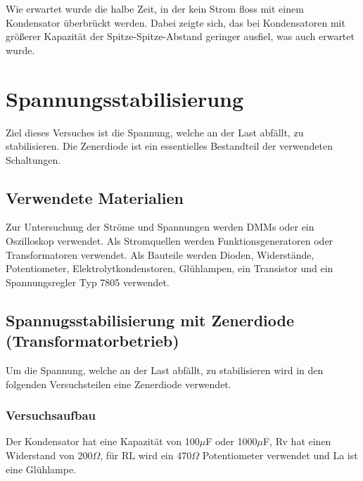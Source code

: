 \documentclass[12pt,a4paper]{article}
\begin{document}
Wie erwartet wurde die halbe Zeit, in der kein Strom floss mit einem Kondensator überbrückt werden. Dabei zeigte sich, das bei Kondensatoren mit größerer Kapazität der Spitze-Spitze-Abstand geringer ausfiel, was auch erwartet wurde. 


\section{Spannungsstabilisierung}
Ziel dieses Versuches ist die Spannung, welche an der Last abfällt, zu stabilisieren. Die Zenerdiode ist ein essentielles Bestandteil der verwendeten Schaltungen.

\subsection{Verwendete Materialien}

Zur Untersuchung der Ströme und Spannungen werden DMMs oder ein Oszilloskop verwendet. Als Stromquellen werden Funktionsgeneratoren oder Transformatoren verwendet. Als Bauteile werden Dioden, Widerstände, Potentiometer, Elektrolytkondenstoren, Glühlampen, ein Transistor und ein Spannungsregler Typ 7805 verwendet.

\subsection{Spannugsstabilisierung mit Zenerdiode (Transformatorbetrieb)}
Um die Spannung, welche an der Last abfällt, zu stabilisieren wird in den folgenden Versuchsteilen eine Zenerdiode verwendet.
\subsubsection{Versuchsaufbau}
Der Kondensator hat eine Kapazität von 100$\mu$F oder 1000$\mu$F, Rv hat einen Widerstand von 200$\Omega$, für RL wird ein 470$\Omega$ Potentiometer verwendet und La ist eine Glühlampe.
\end{document}
